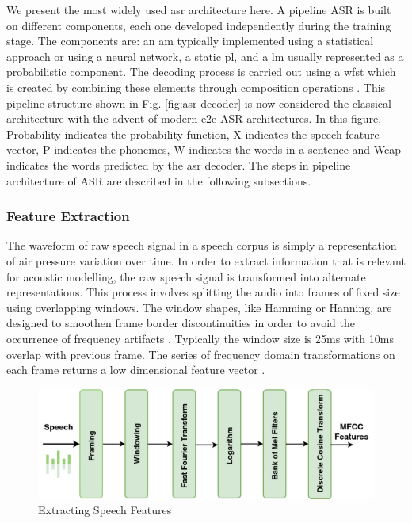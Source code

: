 We present the most widely used \gls{asr} architecture here. A pipeline ASR is built on different
components, each one developed independently during the training stage.  The
components are: an \gls{am} typically implemented using a statistical approach or using a neural network, a static
\gls{pl}, and a \gls{lm} usually represented as a probabilistic
component. The decoding process is carried out using a \gls{wfst} which is
created by combining these elements through composition operations
\cite{gales2008application}. This
pipeline structure shown in Fig. \ref{fig:asr-decoder} \cite{georgescu2021performance} is now considered the classical architecture with the advent of modern
\gls{e2e} ASR architectures. In this figure, \gls{Probability} indicates the probability function, \gls{X} indicates the speech feature vector, \gls{P} indicates the phonemes, \gls{W} indicates the words in a sentence and \gls{Wcap} indicates the words predicted by the \gls{asr} decoder. The steps in pipeline architecture of ASR are described in the following subsections.



\subsubsection{Feature Extraction}

The waveform of raw speech signal in a speech corpus is simply a representation of air
pressure variation over time. In order to extract information that is relevant
for acoustic modelling, the raw speech signal is transformed into alternate
representations. This process involves splitting the audio into frames of fixed
size using overlapping windows. The window shapes, like Hamming or Hanning, are
designed to smoothen frame border discontinuities in order to avoid the
occurrence of frequency artifacts \cite{oppenheim1999discrete}. Typically the
window size is 25ms with 10ms overlap with previous frame. The series of
frequency domain transformations on each frame returns a low dimensional
feature vector \cite{meyer2019multi}.

\begin{figure}[ht]
	\begin{center}
		\includegraphics[width=0.9\linewidth]{featureextraction.jpg}
		\caption{Extracting Speech Features}
		\label{fig:feature-extraction}
	\end{center}
\end{figure}


